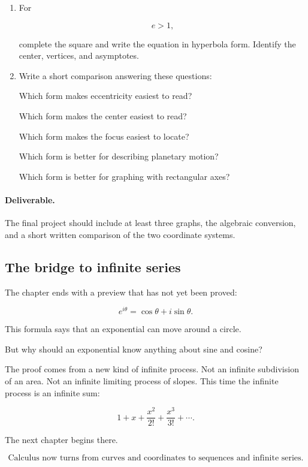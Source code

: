 \begin{enumerate}
show that the equation reduces to a parabola.  Identify its vertex and direction of
opening.

\item For

\[
e>1,
\]

complete the square and write the equation in hyperbola form.  Identify the center,
vertices, and asymptotes.

\item Write a short comparison answering these questions:

Which form makes eccentricity easiest to read?

Which form makes the center easiest to read?

Which form makes the focus easiest to locate?

Which form is better for describing planetary motion?

Which form is better for graphing with rectangular axes?
\end{enumerate}

\paragraph{Deliverable.}
The final project should include at least three graphs, the algebraic conversion, and a
short written comparison of the two coordinate systems.

\subsection{The bridge to infinite series}
\label{subsec:hook-to-infinite-series}

The chapter ends with a preview that has not yet been proved:

\[
e^{i\theta}=\cos\theta+i\sin\theta.
\]

This formula says that an exponential can move around a circle.

But why should an exponential know anything about sine and cosine?

The proof comes from a new kind of infinite process.  Not an infinite subdivision of an
area.  Not an infinite limiting process of slopes.  This time the infinite process is an
infinite sum:

\[
1+x+\frac{x^2}{2!}+\frac{x^3}{3!}+\cdots.
\]

The next chapter begins there.

\[
\boxed{
\text{Calculus now turns from curves and coordinates to sequences and infinite series.}
}
\]
